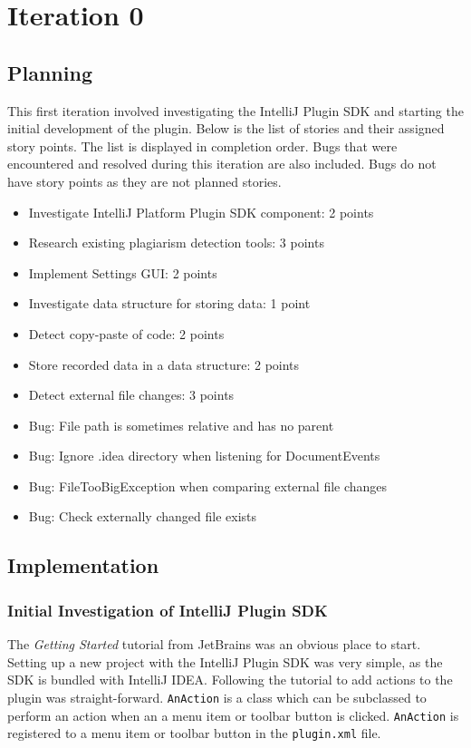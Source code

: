 \chapter{Iteration 0}
\section{Planning}
This first iteration involved investigating the IntelliJ Plugin SDK and starting the initial development of the plugin. Below is the list of stories and their assigned story points. The list is displayed in completion order. Bugs that were encountered and resolved during this iteration are also included. Bugs do not have story points as they are not planned stories.

\begin{itemize}
\item Investigate IntelliJ Platform Plugin SDK component: 2 points
\item Research existing plagiarism detection tools: 3 points
\item Implement Settings GUI: 2 points
\item Investigate data structure for storing data: 1 point
\item Detect copy-paste of code: 2 points
\item Store recorded data in a data structure: 2 points
\item Detect external file changes: 3 points
\item Bug: File path is sometimes relative and has no parent
\item Bug: Ignore .idea directory when listening for DocumentEvents
\item Bug: FileTooBigException when comparing external file changes
\item Bug: Check externally changed file exists
\end{itemize}

\section{Implementation}
\subsection{Initial Investigation of IntelliJ Plugin SDK}
The \textit{Getting Started} tutorial from JetBrains was an obvious place to start\cite{IntelliJGettingStarted}. Setting up a new project with the IntelliJ Plugin SDK was very simple, as the SDK is bundled with IntelliJ IDEA. Following the tutorial to add actions to the plugin was straight-forward. \texttt{AnAction} is a class which can be subclassed to perform an action when an a menu item or toolbar button is clicked. \texttt{AnAction} is registered to a menu item or toolbar button in the \texttt{plugin.xml} file.

